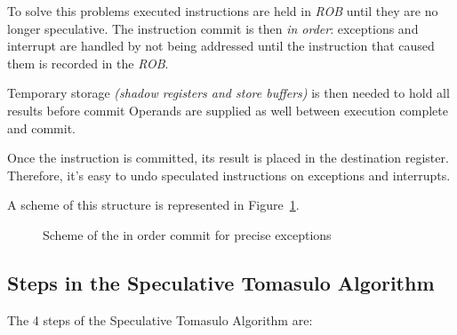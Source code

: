 \documentclass[english]{article}
\begin{document}
To solve this problems executed instructions are held in \textit{ROB} until they are no longer speculative.
The instruction commit is then \textit{in order}: exceptions and interrupt are handled by not being addressed until the instruction that caused them is recorded in the \textit{ROB}.

Temporary storage \textit{(shadow registers and store buffers)} is then needed to hold all results before commit
Operands are supplied as well between execution complete and commit.

Once the instruction is committed, its result is placed in the destination register.
Therefore, it's easy to undo speculated instructions on exceptions and interrupts.

A scheme of this structure is represented in Figure~\ref{fig:exceptions-in-order-commit}.

\begin{figure}[htbp]
  \bigskip
  \centering
  \caption{Scheme of the in order commit for precise exceptions}
  \label{fig:exceptions-in-order-commit}
  \bigskip
\end{figure}

\subsection{Steps in the Speculative Tomasulo Algorithm}

The 4 steps of the Speculative Tomasulo Algorithm are:
\end{document}
